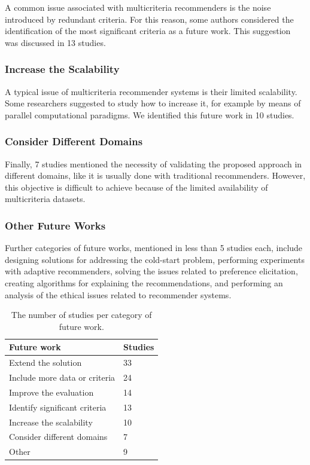A common issue associated with multicriteria recommenders is the noise introduced by redundant criteria. For this reason, some authors considered the identification of the most significant criteria as a future work. This suggestion was discussed in 13 studies.

\subsubsection{Increase the Scalability}

A typical issue of multicriteria recommender systems is their limited scalability. Some researchers suggested to study how to increase it, for example by means of parallel computational paradigms. We identified this future work in 10 studies.

\subsubsection{Consider Different Domains}

Finally, 7 studies mentioned the necessity of validating the proposed approach in different domains, like it is usually done with traditional recommenders. However, this objective is difficult to achieve because of the limited availability of multicriteria datasets.

\subsubsection{Other Future Works}

Further categories of future works, mentioned in less than 5 studies each, include designing solutions for addressing the cold-start problem, performing experiments with adaptive recommenders, solving the issues related to preference elicitation, creating algorithms for explaining the recommendations, and performing an analysis of the ethical issues related to recommender systems.

\begin{table}
\centering
\begin{tabular}{@{}ll@{}}
\toprule
Future work                   & Studies \\ \midrule
Extend the solution           & 33      \\
Include more data or criteria & 24      \\
Improve the evaluation        & 14      \\
Identify significant criteria & 13      \\
Increase the scalability      & 10      \\
Consider different domains    & 7       \\
Other                         & 9       \\ \bottomrule
\end{tabular}
\caption[Studies per category of future work]{The number of studies per category of future work.}
\label{mcr:tab:future}
\end{table}

